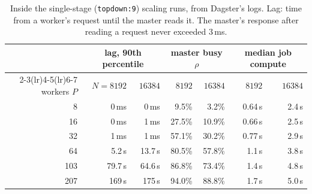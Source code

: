 \documentclass[11pt,a4paper]{article}
\newcommand{\dfam}[1]{\texttt{#1}}
\begin{document}
\begin{table}[htbp]
\centering\small
\begin{tabular}{@{}rrrrrrr@{}}
\toprule
& \multicolumn{2}{c}{lag, 90th percentile} & \multicolumn{2}{c}{master busy $\rho$} & \multicolumn{2}{c}{median job compute} \\
\cmidrule(lr){2-3}\cmidrule(lr){4-5}\cmidrule(lr){6-7}
workers $P$ & $N=8192$ & $16384$ & $8192$ & $16384$ & $8192$ & $16384$ \\
\midrule
8   & 0\,ms   & 0\,ms   & 9.5\% & 3.2\%  & 0.64\,s & 2.4\,s \\
16  & 0\,ms   & 1\,ms   & 27.5\% & 10.9\% & 0.66\,s & 2.5\,s \\
32  & 1\,ms   & 1\,ms   & 57.1\% & 30.2\% & 0.77\,s & 2.9\,s \\
64  & 5.2\,s  & 13.7\,s & 80.5\% & 57.8\% & 1.1\,s & 3.8\,s \\
103 & 79.7\,s & 64.6\,s & 86.8\% & 73.4\% & 1.4\,s & 4.8\,s \\
207 & 169\,s  & 175\,s  & 94.0\% & 88.8\% & 1.7\,s & 5.0\,s \\
\bottomrule
\end{tabular}
\caption{Inside the single-stage (\dfam{topdown:9}) scaling runs, from Dagster's logs. Lag:
time from a worker's request until the master reads it. The master's response after
reading a request never exceeded 3\,ms.}
\label{tab:latency}
\end{table}
\end{document}
